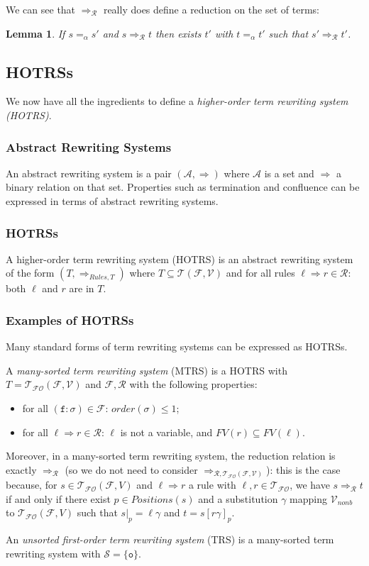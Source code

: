 \documentclass{lmcs}
\theoremstyle{theorem}\newtheorem{theorem}{Theorem}
\theoremstyle{theorem}\newtheorem{lemma}[theorem]{Lemma}
\theoremstyle{theorem}\newtheorem{corollary}[theorem]{Corollary}
\theoremstyle{definition}\newtheorem{definition}[theorem]{Definition}
\theoremstyle{definition}\newtheorem{example}[theorem]{Example}
\newcommand{\F}{\mathcal{F}}
\newcommand{\V}{\mathcal{V}}
\newcommand{\Vfree}{\mathcal{V}_{\mathit{nonb}}}
\newcommand{\Sorts}{\mathcal{S}}
\newcommand{\Terms}{\mathcal{T}}
\newcommand{\FOTerms}{\mathcal{T}_{\mathcal{FO}}}
\newcommand{\Rules}{\mathcal{R}}
\newcommand{\FV}{\mathit{FV}}
\newcommand{\Positions}{\mathit{Positions}}
\newcommand{\order}{\mathit{order}}
\newcommand{\atype}{\sigma}
\newcommand{\identifier}[1]{\mathtt{#1}}
\newcommand{\afun}{\identifier{f}}
\newcommand{\arrz}{\Rightarrow}
\newcommand{\arr}[1]{\arrz_{#1}}
\newcommand{\unitsort}{\mathtt{o}}
\newcommand{\mysubsection}[1]{\vspace{-12pt}\subsubsection{#1}}
\begin{document}
We can see that $\arr{\Rules}$ really does define a reduction on the set of terms:

\begin{lemma}
If $s =_\alpha s'$ and $s \arr{\Rules} t$ then exists $t'$ with $t =_\alpha t'$ such that
$s' \arr{\Rules} t'$.
\end{lemma}

\subsection{HOTRSs}

We now have all the ingredients to define a \emph{higher-order term rewriting system (HOTRS)}.

\mysubsection{Abstract Rewriting Systems}

An abstract rewriting system is a pair $(\mathcal{A},\arrz)$ where $\mathcal{A}$ is a set and
$\arrz$ a binary relation on that set.  Properties such as termination and confluence can be
expressed in terms of abstract rewriting systems.

\mysubsection{HOTRSs}

A higher-order term rewriting system (HOTRS) is an abstract rewriting system of the form
$(T,\arr{Rules,T})$ where $T \subseteq \Terms(\F,\V)$ and for all rules $\ell \arrz r \in \Rules$:
both $\ell$ and $r$ are in $T$.

\mysubsection{Examples of HOTRSs}
Many standard forms of term rewriting systems can be expressed as HOTRSs.

A \emph{many-sorted term rewriting system} (MTRS) is a HOTRS with $T = \FOTerms(\F,\V)$ and
$\F,\Rules$ with the following properties:
\begin{itemize}
\item for all $(\afun : \atype) \in \F$: $\order(\atype) \leq 1$;
\item for all $\ell \arrz r \in \Rules$: $\ell$ is not a variable, and $\FV(r) \subseteq \FV(\ell)$.
\end{itemize}
Moreover, in a many-sorted term rewriting system, the reduction relation is exactly $\arr{\Rules}$
(so we do not need to consider $\arr{\Rules,\FOTerms(\F,\V)}$): this is the case because, for
$s \in \FOTerms(\F,V)$ and $\ell \arrz r$ a rule with $\ell,r \in \FOTerms$, we have
$s \arr{\Rules} t$ if and only if there exist $p \in \Positions(s)$ and a substitution $\gamma$
mapping $\Vfree$ to $\FOTerms(\F,V)$ such that $s|_p = \ell\gamma$ and $t = s[r\gamma]_p$.

An \emph{unsorted first-order term rewriting system} (TRS) is a many-sorted term rewriting system
with $\Sorts = \{ \unitsort \}$.
\end{document}
